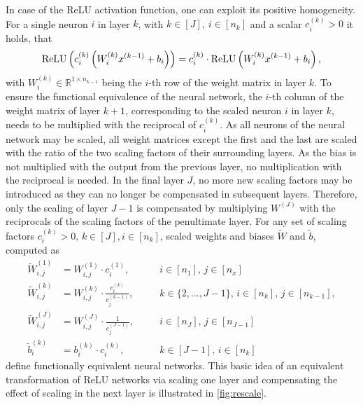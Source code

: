 In case of the ReLU activation function, one can exploit its positive homogeneity. For a single neuron $i$ in layer $k$, with $k \in [J], \ i \in [n_k]$ and a scalar $c^{(k)}_i > 0$ it holds, that
\begin{align}
    \textrm{ReLU}\left(c^{(k)}_i \left( W^{(k)}_i x^{(k-1)} + b_i \right)\right) = c^{(k)}_i \cdot \textrm{ReLU}\left( W^{(k)}_i x^{(k-1)} + b_i\right),
\end{align}
with $W^{(k)}_i \in \mathbb{R}^{1 \times n_{k-1}}$ being the $i$-th row of the weight matrix in layer $k$. 
%
To ensure the functional equivalence of the neural network, the $i$-th column of the weight matrix of layer $k+1$, corresponding to the scaled neuron $i$ in layer $k$, needs to be multiplied with the reciprocal of $c^{(k)}_i$. As all neurons of the neural network may be scaled, all weight matrices except the first and the last are scaled with the ratio of the two scaling factors of their surrounding layers. As the bias is not multiplied with the output from the previous layer, no multiplication with the reciprocal is needed. In the final layer $J$, no more new scaling factors may be introduced as they can no longer be compensated in subsequent layers. Therefore, only the scaling of layer $J-1$ is compensated by multiplying $W^{(J)}$ with the reciprocals of the scaling factors of the penultimate layer. For any set of scaling factors $c^{(k)}_i > 0,\,k \in [J], i \in [n_k]$, scaled weights and biases  $\tilde{W}$ and $\tilde b$, computed as 
\begin{equation}
    \begin{alignedat}{3}
        \tilde{W}_{i,j}^{(1)} &= W_{i,j}^{(1)} \cdot c_i^{(1)}, \quad && i \in [n_1],\, j \in [n_x] \\       
        \tilde{W}_{i,j}^{(k)} &= W_{i,j}^{(k)} \cdot \frac{c_i^{(k)}}{c_j^{(k-1)}}, \quad && k \in \{2, \ldots, J-1\},\, i \in [n_k],\, j \in [n_{k-1}],\\
        \tilde{W}_{i,j}^{(J)} &= W_{i,j}^{(J)} \cdot \frac{1}{c_j^{(J-1)}}, \quad && i \in [n_J],\, j \in [n_{J-1}] \\
        \tilde{b}_i^{(k)} &= b_i^{(k)} \cdot c_i^{(k)}, \quad && k \in [J-1], \, i \in [n_k]
    \end{alignedat}
\end{equation}
define functionally equivalent neural networks.
This basic idea of an equivalent transformation of ReLU networks via scaling one layer and compensating the effect of scaling in the next layer is illustrated in \vref{fig:rescale}. 


